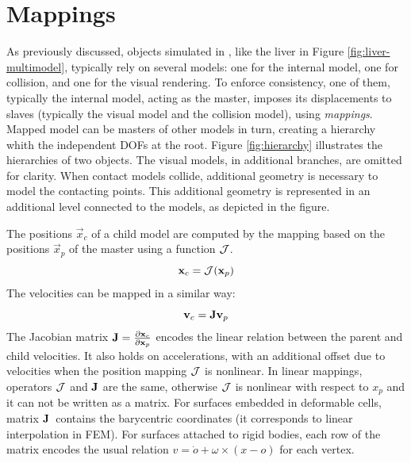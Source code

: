  \section{Mappings} \label{sec:mappings}
As previously discussed, objects simulated in \sofa, like the liver in Figure \ref{fig:liver-multimodel}, typically rely on several models: one for the internal model, one for collision, and one for the visual rendering. 
To enforce consistency, one of them, typically the internal model, acting as the master, imposes its displacements to slaves (typically the visual model and the collision model), using \textit{mappings}.
Mapped model can be masters of other models in turn, creating a hierarchy whith the independent DOFs at the root.
Figure \ref{fig:hierarchy} illustrates the hierarchies of two objects. The visual models, in additional branches, are omitted for clarity. When contact models collide, additional geometry is necessary to model the contacting points.
This additional geometry is represented in an additional level connected to the models, as depicted in the figure. 


The positions $\vec x_c$ of a child model are computed by the mapping based on the positions $\vec x_p$ of the master using a function $\mathbf{\mathcal{J}}$. 
\begin{equation} %
\vec x_c =\JNL(\vec x_p)
\end{equation}
% 
% 
The velocities can be mapped in a similar way:
\begin{equation}
\mathbf{v }_c = \mathbf{{J}} \mathbf{v }_p
\end{equation}
The Jacobian matrix $\mathbf{{J}} = \frac{\partial \mathbf{x }_c}{\partial \mathbf{x }_p}$ encodes the linear relation between the parent and child velocities.
It also holds on accelerations, with an additional offset due to velocities when the position mapping $\mathbf{\mathcal{J}}$ is nonlinear.
In linear mappings, operators $\mathbf{\mathcal{J}}$ and $\mathbf{{J}}$ are the same, otherwise $\mathbf{\mathcal{J}}$ is nonlinear with respect to $x_p$ and it can not be written as a matrix.
For surfaces embedded in deformable cells, matrix $\mathbf{{J}}$~contains the barycentric coordinates (it corresponds to linear interpolation in FEM).
For surfaces attached to rigid bodies, each row of the matrix encodes the usual relation $v = \dot o + \omega \times (x-o)$ for each vertex. 

